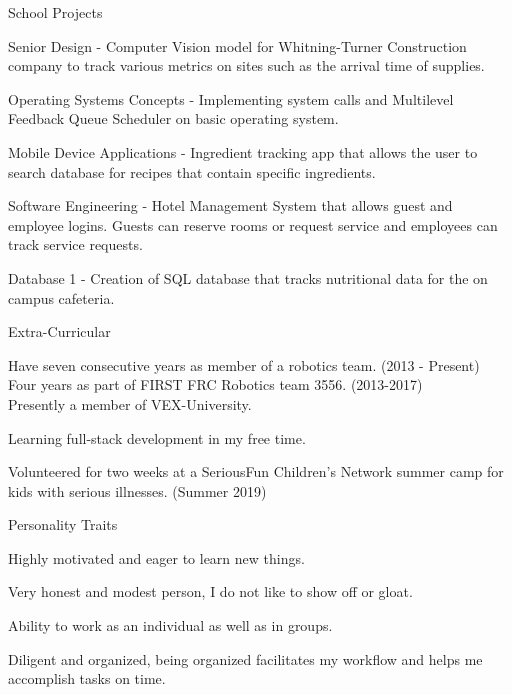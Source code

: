\documentclass{resume} %
\begin{document}
\begin{rSection}{School Projects} \itemsep -3pt
	\item Senior Design - Computer Vision model for Whitning-Turner Construction company to track various metrics on sites such as the arrival time of supplies.
	\item Operating Systems Concepts - Implementing system calls and Multilevel Feedback Queue Scheduler on basic operating system.
	\item Mobile Device Applications - Ingredient tracking app that allows the user to search database for recipes that contain specific ingredients.
	\item Software Engineering - Hotel Management System that allows guest and employee logins. Guests can reserve rooms or request service and employees can track service requests.
	\item Database 1 - Creation of SQL database that tracks nutritional data for the on campus cafeteria.
\end{rSection}

\begin{rSection}{Extra-Curricular} \itemsep -3pt
	\item Have seven consecutive years as member of a robotics team. (2013 - Present)\\
	Four years as part of FIRST FRC Robotics team 3556. (2013-2017)\\
	Presently a member of VEX-University.
	\item Learning full-stack development in my free time.
	\item Volunteered for two weeks at a SeriousFun Children's Network summer camp for kids with serious illnesses. (Summer 2019)
\end{rSection}

\begin{rSection}{Personality Traits}
	\item Highly motivated and eager to learn new things.
	\item Very honest and modest person, I do not like to show off or gloat.
	\item Ability to work as an individual as well as in groups.
	\item Diligent and organized, being organized facilitates my workflow and helps me accomplish tasks on time.
\end{rSection}
\end{document}
